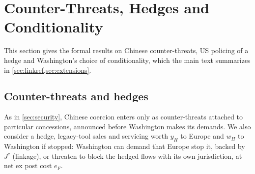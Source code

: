 \section{Counter-Threats, Hedges and Conditionality}\label{app:counter}

This section gives the formal results on Chinese counter-threats, US policing of a hedge and Washington's choice of conditionality, which the main text summarizes in \cref{sec:linkref,sec:extensions}.

\subsection{Counter-threats and hedges}\label{sec:counter}

As in \cref{sec:security}, Chinese coercion enters only as counter-threats attached to particular concessions, announced before Washington makes its demands. We also consider a hedge, legacy-tool sales and servicing worth $y_H$ to Europe and $w_H$ to Washington if stopped: Washington can demand that Europe stop it, backed by $J^c$ (linkage), or threaten to block the hedged flows with its own jurisdiction, at net ex post cost $e_F$.

